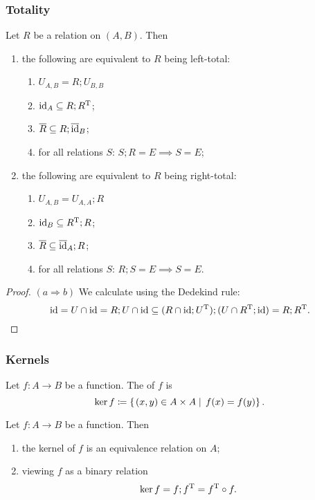 \subsubsection{Totality}
\begin{lemma}
Let $R$ be a relation on $(A, B)$. Then
\begin{enumerate}
\item the following are equivalent to $R$ being left-total:
\begin{enumerate}
\item $U_{A,B} = R;U_{B,B}$
\item $\operatorname{id}_A \subseteq R;R^{\mathrm{T}}$;
\item $\overline{R}\subseteq R;\overline{\operatorname{id}}_B$;
\item for all relations $S$: $S;R = E \implies S = E$;
\end{enumerate}
\item the following are equivalent to $R$ being right-total:
\begin{enumerate}
\item $U_{A,B} = U_{A,A};R$
\item $\operatorname{id}_B \subseteq R^{\mathrm{T}};R$;
\item $\overline{R}\subseteq \overline{\operatorname{id}}_A;R$;
\item for all relations $S$: $R;S = E \implies S = E$.
\end{enumerate}
\end{enumerate}
\end{lemma}
\begin{proof}
$(a \Rightarrow b)$ We calculate using the Dedekind rule:
\[ \operatorname{id} = U\cap \operatorname{id} = R;U\cap \operatorname{id} \subseteq (R\cap \operatorname{id};U^{\mathrm{T}});(U\cap R^{\mathrm{T}};\operatorname{id}) = R;R^{\mathrm{T}}. \]
\end{proof}

\subsubsection{Kernels}

\begin{definition}
Let $f:A\to B$ be a function. The  of $f$ is
\[ \ker f \coloneqq \left\{\left. (x,y)\in A\times A \;\right|\; f(x) = f(y) \right\}. \]
\end{definition}

\begin{lemma}
Let $f:A\to B$ be a function. Then
\begin{enumerate}
\item the kernel of $f$ is an equivalence relation on $A$;
\item viewing $f$ as a binary relation
\[ \ker f = f;f^{\mathrm{T}} = f^{\mathrm{T}}\circ f. \]
\end{enumerate}
\end{lemma}

